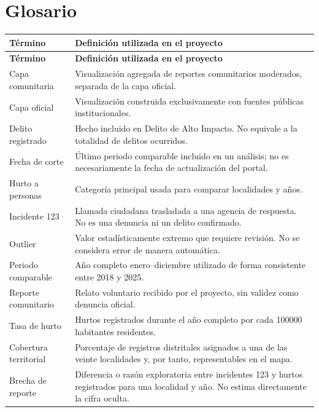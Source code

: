 \documentclass[11pt,letterpaper,oneside]{report}
\begin{document}
\appendix
\chapter{Glosario}

\begin{longtable}{L{0.25\textwidth}L{0.67\textwidth}}
\toprule
\textbf{Término} & \textbf{Definición utilizada en el proyecto} \\
\midrule
\endfirsthead
\toprule
\textbf{Término} & \textbf{Definición utilizada en el proyecto} \\
\midrule
\endhead
Capa comunitaria & Visualización agregada de reportes comunitarios moderados, separada de la capa oficial. \\
Capa oficial & Visualización construida exclusivamente con fuentes públicas institucionales. \\
Delito registrado & Hecho incluido en Delito de Alto Impacto. No equivale a la totalidad de delitos ocurridos. \\
Fecha de corte & Último periodo comparable incluido en un análisis; no es necesariamente la fecha de actualización del portal. \\
Hurto a personas & Categoría principal usada para comparar localidades y años. \\
Incidente 123 & Llamada ciudadana trasladada a una agencia de respuesta. No es una denuncia ni un delito confirmado. \\
Outlier & Valor estadísticamente extremo que requiere revisión. No se considera error de manera automática. \\
Periodo comparable & Año completo enero--diciembre utilizado de forma consistente entre 2018 y 2025. \\
Reporte comunitario & Relato voluntario recibido por el proyecto, sin validez como denuncia oficial. \\
Tasa de hurto & Hurtos registrados durante el año completo por cada \num{100000} habitantes residentes. \\
Cobertura territorial & Porcentaje de registros distritales asignados a una de las veinte localidades y, por tanto, representables en el mapa. \\
Brecha de reporte & Diferencia o razón exploratoria entre incidentes 123 y hurtos registrados para una localidad y año. No estima directamente la cifra oculta. \\
\bottomrule
\end{longtable}
\end{document}
